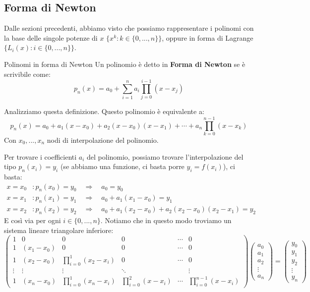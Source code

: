 \documentclass[11pt,a4paper,twoside]{article}
\theoremstyle{definition}
\begin{document}
\subsection{Forma di Newton}

Dalle sezioni precedenti, abbiamo visto che possiamo rappresentare i polinomi con la base delle singole potenze di $x$ $\{x^k : k \in \{0,...,n\}\}$, oppure in forma di Lagrange $\{L_i(x):i \in \{0,...,n\}\}$.

\begin{defn}{Polinomi in forma di Newton}{}
	Un polinomio è detto in \textbf{Forma di Newton} se è scrivibile come:
	\[ p_n(x) = a_0 + \sum_{i = 1}^n a_i \prod_{j = 0}^{i-1}(x-x_j)\]
\end{defn}

Analizziamo questa definizione. Questo polinomio è equivalente a:
\[ p_n(x) = a_0 + a_1(x-x_0) + a_2(x-x_0)(x-x_1) + \cdots + a_n \prod_{k=0}^{n-1}(x-x_k)\]
Con $x_0,...,x_n$ nodi di interpolazione del polinomio.

Per trovare i coefficienti $a_i$ del polinomio, possiamo trovare l'interpolazione del tipo $p_n(x_i) = y_i$ (se abbiamo una funzione, ci basta porre $y_i = f(x_i)$), ci basta:
\begin{align*}
	x = x_0 &: p_n(x_0) = y_0 \quad \Rightarrow \quad a_0 = y_0\\
	x=x_1 &: p_n(x_1) = y_1 \quad \Rightarrow \quad a_0 + a_1(x_1-x_0) = y_1\\
	x=x_2 &: p_n(x_2) = y_2 \quad \Rightarrow \quad a_0 + a_1(x_2-x_0) + a_2(x_2-x_0)(x_2-x_1) = y_2
\end{align*}
E così via per ogni $i \in \{0,...,n\}$. Notiamo che in questo modo troviamo un sistema lineare triangolare inferiore:
\[
	\begin{pmatrix}
		1 & 0 & 0 & 0 & \cdots & 0\\
		1 & (x_1-x_0) & 0 & 0 & \cdots & 0\\
		1 & (x_2-x_0) & \prod_{i = 0}^1(x_2-x_i) & 0 & \cdots & 0\\
		\vdots & \vdots & \vdots & \ddots & & \vdots\\
		1 & (x_n-x_0) & \prod_{i = 0}^1(x_n-x_i) & \prod_{i = 0}^2(x-x_i) & \cdots & \prod_{i = 0}^{n-1}(x-x_i)
	\end{pmatrix}
	\begin{pmatrix}a_0\\ a_1\\ a_2 \\ \vdots \\ a_n\end{pmatrix} =
	\begin{pmatrix} y_0\\ y_1\\ y_2\\ \vdots\\ y_n\end{pmatrix}
\]
\end{document}
